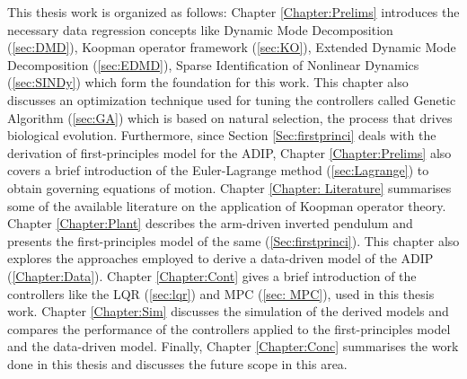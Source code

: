 This thesis work is organized as follows: Chapter \ref{Chapter:Prelims} introduces the necessary data regression concepts like Dynamic Mode Decomposition (\ref{sec:DMD}), Koopman operator framework (\ref{sec:KO}), Extended Dynamic Mode Decomposition (\ref{sec:EDMD}), Sparse Identification of Nonlinear Dynamics (\ref{sec:SINDy}) which form the foundation for this work. This chapter also discusses an optimization technique used for tuning the controllers called Genetic Algorithm (\ref{sec:GA}) which is based on natural selection, the process that drives biological evolution. Furthermore, since Section \ref{Sec:firstprinci} deals with the derivation of first-principles model for the ADIP, Chapter \ref{Chapter:Prelims} also covers a brief introduction of the Euler-Lagrange method (\ref{sec:Lagrange}) to obtain governing equations of motion. Chapter \ref{Chapter: Literature} summarises some of the available literature on the application of Koopman operator theory. Chapter \ref{Chapter:Plant} describes the arm-driven inverted pendulum and presents the first-principles model of the same (\ref{Sec:firstprinci}). This chapter also explores the approaches employed to derive a data-driven model of the ADIP (\ref{Chapter:Data}). Chapter \ref{Chapter:Cont} gives a brief introduction of the controllers like the LQR (\ref{sec:lqr}) and MPC (\ref{sec: MPC}), used in this thesis work. Chapter \ref{Chapter:Sim} discusses the simulation of the derived models and compares the performance of the controllers applied to the first-principles model and the data-driven model. Finally, Chapter \ref{Chapter:Conc} summarises the work done in this thesis and discusses the future scope in this area.
\newpage

